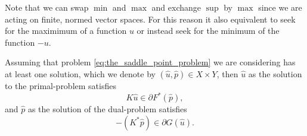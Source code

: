     Note that we can swap $\min$ and $\max$ and exchange $\sup$ by $\max$ since we are acting on finite, normed vector spaces. For this reason it also equivalent to seek for the maximimum of a function $u$ or instead seek for the minimum of the function $-u$.



    Assuming that problem \ref{eq:the_saddle_point_problem} we are considering has at least one solution, which we denote by $(\hat{u}, \hat{p}) \in X \times Y$, then $\hat{u}$ as the solution to the primal-problem satisfies
        \begin{equation}
            K\hat{u} \in \partial F^{\ast}(\hat{p}),
            \label{eq:kx_in_subgradient}
        \end{equation}
    and $\hat{p}$ as the solution of the dual-problem satisfies
        \begin{equation}
            -(K^{\ast}\hat{p}) \in \partial G(\hat{u}).
            \label{eq:k_star_y_in_subgradient}
        \end{equation}
        
